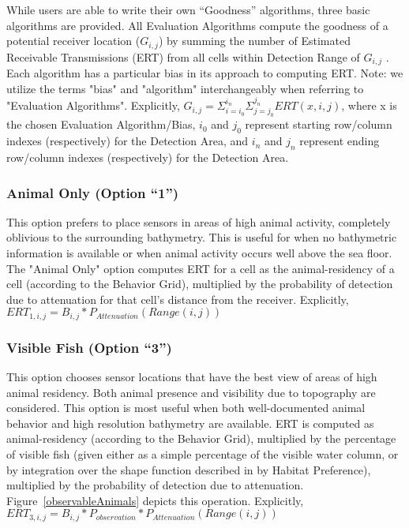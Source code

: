 While users are able to write their own “Goodness” algorithms, three basic algorithms are provided.  All Evaluation Algorithms compute the goodness of a potential receiver location ($G_{i,j}$) by summing the number of Estimated Receivable Transmissions (ERT) from all cells within Detection Range of $G_{i,j}$ .  Each algorithm has a particular bias in its approach to computing ERT.  Note: we utilize the terms "bias" and "algorithm" interchangeably when referring to "Evaluation Algorithms".\newline\newline
Explicitly, $G_{i,j} = \Sigma_{i=i_0}^{i_n} \Sigma_{j=j_0}^{j_n} ERT(x,i,j)$, where x is the chosen Evaluation Algorithm/Bias, $i_0$ and $j_0$ represent starting row/column indexes (respectively) for the Detection Area, and $i_n$ and $j_n$ represent ending row/column indexes (respectively) for the Detection Area.

\subsubsection{Animal Only (Option “1”)}
This option prefers to place sensors in areas of high animal activity, completely oblivious to the surrounding bathymetry.  This is useful for when no bathymetric information is available or when animal activity occurs well above the sea floor.   The "Animal Only" option computes ERT for a cell as the animal-residency of a cell (according to the Behavior Grid), multiplied by the probability of detection due to attenuation for that cell's distance from the receiver.\newline
Explicitly,
$ERT_{1,i,j} = B_{i,j} * P_{Attenuation}(Range(i,j))$

\subsubsection{Visible Fish (Option “3”)}
This option chooses sensor locations that have the best view of areas of high animal residency.  Both animal presence and visibility due to topography are considered. This option is most useful when both well-documented animal behavior and high resolution bathymetry are available.  ERT is computed as animal-residency (according to the Behavior Grid), multiplied by the percentage of visible fish (given either as a simple percentage of the visible water column, or by integration over the shape function described in by Habitat Preference), multiplied by the probability of detection due to attenuation.  Figure~\ref{observableAnimals} depicts this operation.\newline
Explicitly,
$ERT_{3,i,j} =  B_{i,j} * P_{observation} * P_{Attenuation}(Range(i,j))$

